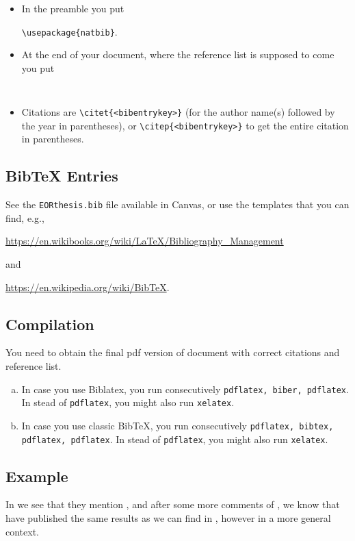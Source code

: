 \documentclass[a4paper,11pt]{article}
\theoremstyle{plain}
\theoremstyle{definition}
\begin{document}
\begin{itemize}
\item
In the preamble you put

\verb+\usepackage{natbib}+.

\item
At the end of your document, where the reference list is supposed to come you
put

\begin{verbatim}


\end{verbatim}

\item
Citations are \verb+\citet{<bibentrykey>}+ (for the author name(s)
followed by the year in parentheses), or
\verb+\citep{<bibentrykey>}+
to get the entire citation in parentheses.
\end{itemize}

\subsection{BibTeX Entries}\label{ss:bibtex}
See the \texttt{EORthesis.bib} file available in Canvas,
or use the templates that you can find, e.g.,

\url{https://en.wikibooks.org/wiki/LaTeX/Bibliography_Management}

\noindent
and

\url{https://en.wikipedia.org/wiki/BibTeX}.

\subsection{Compilation}
You need to obtain the final pdf version of document with correct citations and reference
list.

\begin{enumerate}[(a).]
\item
In case you use Biblatex, you run consecutively
\texttt{pdflatex, biber, pdflatex}. In stead of
\texttt{pdflatex}, you might also run \texttt{xelatex}.
\item
In case you use classic BibTeX, you run consecutively
\texttt{pdflatex, bibtex, pdflatex, pdflatex}. In stead of
\texttt{pdflatex}, you might also run \texttt{xelatex}.
\end{enumerate}

\subsection{Example}
In \citet{asmus07} we see that they mention \citep{blitzstein10},
and after some more comments of \citet{asrub1}, we know that
\citet{evkekro07} have published the same results
as we can find in \citep{alon,garvels00,ross06},
however in a more general context.
\end{document}
